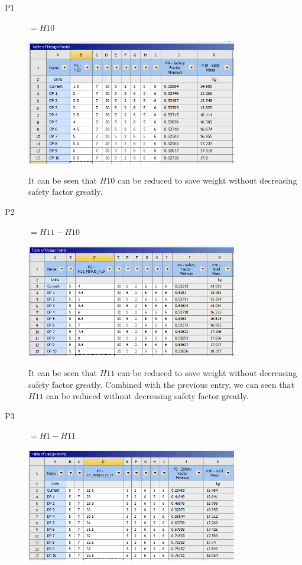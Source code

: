 \documentclass[a4paper,14pt]{extarticle}
\begin{document}
\begin{description}
\item[P1] $=H10$

\includegraphics[width=0.75\textwidth]{singleParam/P1.PNG}

It can be seen that $H10$ can be reduced to save weight without decreasing safety factor greatly.
\item[P2] $=H11-H10$

\includegraphics[width=0.75\textwidth]{singleParam/P2.PNG}

It can be seen that $H11$ can be reduced to save weight without decreasing safety factor greatly. Combined with the previous entry, we can seen that $H11$ can be reduced without decreasing safety factor greatly.
\item[P3] $=H1-H11$

\includegraphics[width=0.75\textwidth]{singleParam/P3.PNG}


\end{description}
\end{document}
